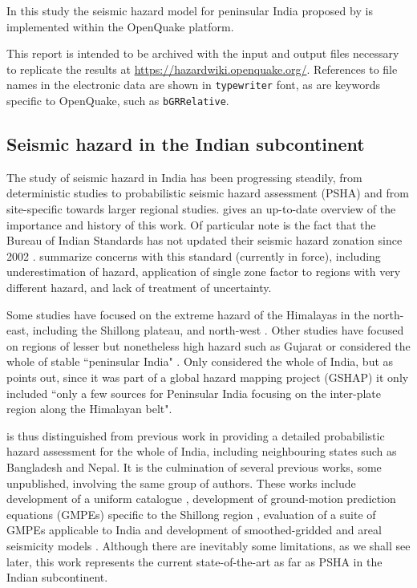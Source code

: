 \documentclass{article}
\begin{document}
In this study the seismic hazard model for peninsular India proposed by \cite{nath2012probabilistic} is implemented within the OpenQuake \citep{pagani2014openquake,crowley2015openquake} platform.

This report is intended to be archived with the input and output files necessary to replicate the results at \url{https://hazardwiki.openquake.org/}.
References to file names in the electronic data are shown in \texttt{typewriter} font, as are keywords specific to OpenQuake, such as \texttt{bGRRelative}.

\subsection{Seismic hazard in the Indian subcontinent}
\label{subsec:PshaIndia}

The study of seismic hazard in India has been progressing steadily, from deterministic studies \citep{bis2002criteria} to probabilistic seismic hazard assessment (PSHA) and from site-specific towards larger regional studies.
\cite{ashish2016probabilistic} gives an up-to-date overview of the importance and history of this work.
Of particular note is the fact that the Bureau of Indian Standards has not updated their seismic hazard zonation since 2002 \citep{bis2002criteria}.
\cite{nath2012probabilistic} summarize concerns with this standard (currently in force), including underestimation of hazard, application of single zone factor to regions with very different hazard, and lack of treatment of uncertainty.

Some studies have focused on the extreme hazard of the Himalayas \citep{Bilham2001} in the north-east, including the Shillong plateau, \citep{Das2006} and north-west \citep{Mahajan2009}.
Other studies have focused on regions of lesser but nonetheless high hazard such as Gujarat \citep{Yadav2008} or considered the whole of stable ``peninsular India" \citep{jaiswal2007, ashish2016probabilistic}.
Only \cite{bhatia1999probabilistic} considered the whole of India, but as \cite{ashish2016probabilistic} points out, since it was part of a global hazard mapping project (GSHAP) it only included ``only a few sources for Peninsular India focusing on the inter-plate region along the Himalayan belt".

\cite{nath2012probabilistic} is thus distinguished from previous work in providing a detailed probabilistic hazard assessment for the whole of India, including neighbouring states such as Bangladesh and Nepal.
It is the culmination of several previous works, some unpublished, involving the same group of authors.
These works include development of a uniform catalogue \citep{nath2010earthquake}, development of ground-motion prediction equations (GMPEs) specific to the Shillong region \citep{nath2012ground}, evaluation of a suite of GMPEs applicable to India \citep{nath2011peak} and development of smoothed-gridded and areal seismicity models \citep{thingbaijam2011seismogenic}.
Although there are inevitably some limitations, as we shall see later, this work represents the current state-of-the-art as far as PSHA in the Indian subcontinent.
\end{document}
